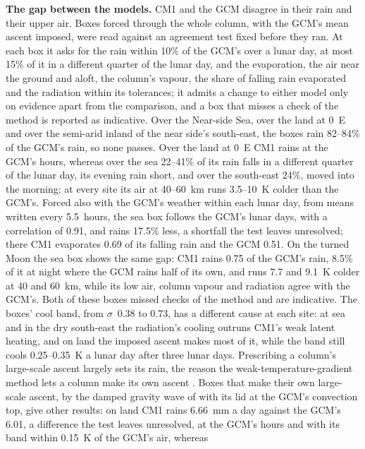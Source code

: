 \textbf{The gap between the models.} CM1 and the GCM disagree in their rain and their upper air. Boxes forced through the whole column, with the GCM's mean
ascent imposed, were read against an agreement test fixed before they ran. At each box it asks for the rain within 10\% of the GCM's over a lunar day, at most 15\% of it in a
different quarter of the lunar day, and the evaporation, the air near the ground and aloft, the column's vapour, the
share of falling rain evaporated and the radiation within its tolerances; it admits a change to either model
only on evidence apart from the comparison, and a box that misses a check of the method is reported as
indicative. Over the Near-side Sea,
over the land at 0\textdegree~E and over the semi-arid inland of the near side's south-east, the boxes rain
82--84\% of the GCM's rain, so none passes. Over the land at 0\textdegree~E CM1 rains at the GCM's
hours, whereas over the sea 22--41\% of its rain falls in a different quarter of the lunar day, its evening rain
short, and over the south-east 24\%, moved into the morning; at every site its air at 40--60~km runs 3.5--10~K colder
than the GCM's. Forced also with the GCM's weather within each lunar day, from means written every
5.5~hours, the sea box follows the GCM's lunar days, with a correlation of 0.91, and rains 17.5\% less, a shortfall
the test leaves unresolved; there CM1 evaporates 0.69 of its falling rain and the GCM 0.51. On the turned Moon the sea box shows the same gap: CM1 rains 0.75 of the GCM's rain, 8.5\% of it at night where the GCM
rains half of its own, and runs 7.7 and 9.1~K colder at 40 and 60~km, while its low air, column vapour and radiation
agree with the GCM's. Both of these boxes missed checks of the method and are indicative. The boxes' cool band, from $\sigma$~0.38 to 0.73,
has a different cause at each site: at sea and in the dry south-east the radiation's cooling outruns CM1's weak
latent heating, and on land the imposed ascent makes most of it, while the band still cools 0.25--0.35~K a lunar day
after three lunar days. Prescribing a column's large-scale ascent largely sets its rain, the reason
the weak-temperature-gradient method lets a column make its own ascent \autocite{sobel2000modeling}. Boxes that make
their own large-scale ascent, by the damped gravity wave of
\textcite{kuang2008modeling} with its lid at the GCM's convection top, give other results: on land CM1 rains 6.66~mm a day against the GCM's 6.01, a
difference the test leaves unresolved, at the GCM's hours and with its band within 0.15~K of the GCM's air, whereas

